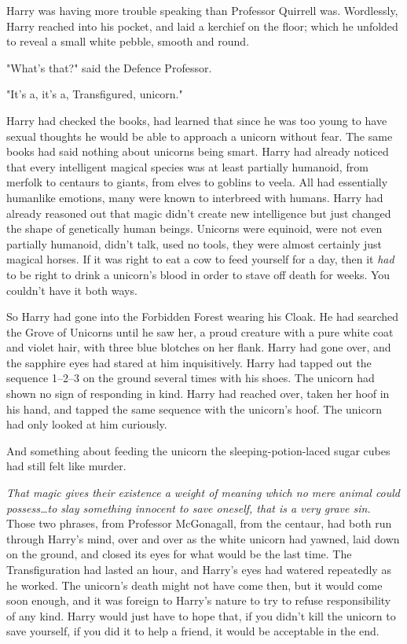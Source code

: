 Harry was having more trouble speaking than Professor Quirrell was. Wordlessly,
Harry reached into his pocket, and laid a kerchief on the floor; which he
unfolded to reveal a small white pebble, smooth and round.

"What's that?" said the Defence Professor.

"It's a, it's a, Transfigured, unicorn."

Harry had checked the books, had learned that since he was too young to have
sexual thoughts he would be able to approach a unicorn without fear. The same
books had said nothing about unicorns being smart. Harry had already noticed
that every intelligent magical species was at least partially humanoid, from
merfolk to centaurs to giants, from elves to goblins to veela. All had
essentially humanlike emotions, many were known to interbreed with humans.
Harry had already reasoned out that magic didn't create new intelligence but
just changed the shape of genetically human beings. Unicorns were equinoid,
were not even partially humanoid, didn't talk, used no tools, they were almost
certainly just magical horses. If it was right to eat a cow to feed yourself
for a day, then it \emph{had} to be right to drink a unicorn's blood in order
to stave off death for weeks. You couldn't have it both ways.

So Harry had gone into the Forbidden Forest wearing his Cloak. He had searched
the Grove of Unicorns until he saw her, a proud creature with a pure white coat
and violet hair, with three blue blotches on her flank. Harry had gone over,
and the sapphire eyes had stared at him inquisitively. Harry had tapped out the
sequence 1--2--3 on the ground several times with his shoes. The unicorn had
shown no sign of responding in kind. Harry had reached over, taken her hoof in
his hand, and tapped the same sequence with the unicorn's hoof. The unicorn had
only looked at him curiously.

And something about feeding the unicorn the sleeping-potion-laced sugar cubes
had still felt like murder.

\emph{That magic gives their existence a weight of meaning which no mere animal
could possess…to slay something innocent to save oneself, that is a
very grave sin.} Those two phrases, from Professor McGonagall, from the
centaur, had both run through Harry's mind, over and over as the white unicorn
had yawned, laid down on the ground, and closed its eyes for what would be the
last time. The Transfiguration had lasted an hour, and Harry's eyes had watered
repeatedly as he worked. The unicorn's death might not have come then, but it
would come soon enough, and it was foreign to Harry's nature to try to refuse
responsibility of any kind. Harry would just have to hope that, if you didn't
kill the unicorn to save yourself, if you did it to help a friend, it would be
acceptable in the end.

